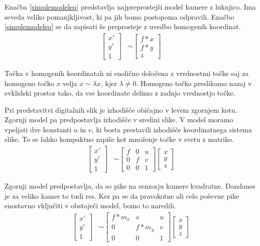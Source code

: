 \documentclass[a4paper, 12pt]{book}
\begin{document}
Enačba \eqref{simplemodeleq} predstavlja najpreprostejši model kamere z luknjico. Ima seveda veliko pomanjkljivost, ki pa jih bomo postopoma odpravili. Enačbo \eqref{simplemodeleq} se da zapisati še preprosteje z uvedbo homogenih koordinat.
\begin{align}
\begin{bmatrix}
x' \\
y' \\
1
\end{bmatrix}
&\sim 
\begin{bmatrix}
f*x \\
f*y \\
z
\end{bmatrix}
\end{align}

Točka v homogenih koordinatah ni enolično določena z vrednostmi točke saj za homogeno točko $x$ velja $x \sim \lambda x$, kjer $\lambda \neq 0$. Homogeno točko preslikamo nazaj v evklidski prostor tako, da vse koordinate delimo z zadnjo vrednostjo točke. 

Pri predstavitvi digitalnih slik je izhodišče običajno v levem zgornjem kotu. Zgornji model pa predpostavlja izhodišče v sredini slike. V model moramo vpeljati dve konstanti $u$ in $v$, ki bosta prestavili izhodišče koordinatnega sistema slike. To se lahko kompaktno zapiše kot množenje točke v svetu z matriko.
\begin{align}
\begin{bmatrix}
x' \\
y' \\
1
\end{bmatrix}
&\sim
\begin{bmatrix}
f & 0 & u \\
0 & f & v \\
0 & 0 & 1
\end{bmatrix}
\begin{bmatrix}
x \\
y \\
z
\end{bmatrix}
\end{align}

Zgornji model predpostavlja, da so pike na senzorju kamere kvadratne. Dandanes je za veliko kamer to tudi res. Ker pa se da pravokotne ali celo poševne pike enostavno vključiti v obstoječi model, bomo to naredili.
\begin{align}
\begin{bmatrix}
x' \\
y' \\
1
\end{bmatrix}
&\sim
\begin{bmatrix}
f*m_x & s & u \\
0 & f*m_y & v \\
0 & 0 & 1
\end{bmatrix}
\begin{bmatrix}
x \\
y \\
z
\end{bmatrix}
\label{internaleq}
\end{align}
\end{document}
